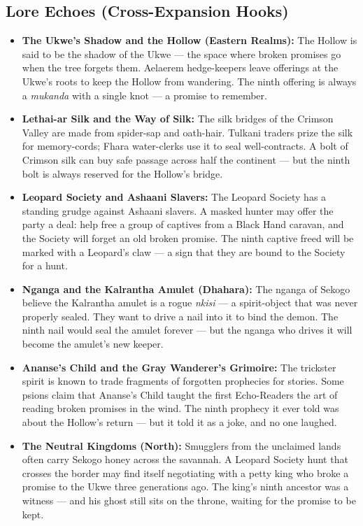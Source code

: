 \subsection*{Lore Echoes (Cross-Expansion Hooks)}
\begin{itemize}
  \item \textbf{The Ukwe's Shadow and the Hollow (Eastern Realms):} The Hollow is said to be the shadow of the Ukwe --- the space where broken promises go when the tree forgets them. Aelaerem hedge-keepers leave offerings at the Ukwe's roots to keep the Hollow from wandering. The ninth offering is always a \textit{mukanda} with a single knot --- a promise to remember.
  \item \textbf{Lethai-ar Silk and the Way of Silk:} The silk bridges of the Crimson Valley are made from spider-sap and oath-hair. Tulkani traders prize the silk for memory-cords; Fhara water-clerks use it to seal well-contracts. A bolt of Crimson silk can buy safe passage across half the continent --- but the ninth bolt is always reserved for the Hollow's bridge.
  \item \textbf{Leopard Society and Ashaani Slavers:} The Leopard Society has a standing grudge against Ashaani slavers. A masked hunter may offer the party a deal: help free a group of captives from a Black Hand caravan, and the Society will forget an old broken promise. The ninth captive freed will be marked with a Leopard's claw --- a sign that they are bound to the Society for a hunt.
  \item \textbf{Nganga and the Kalrantha Amulet (Dhahara):} The nganga of Sekogo believe the Kalrantha amulet is a rogue \textit{nkisi} --- a spirit-object that was never properly sealed. They want to drive a nail into it to bind the demon. The ninth nail would seal the amulet forever --- but the nganga who drives it will become the amulet's new keeper.
  \item \textbf{Ananse's Child and the Gray Wanderer's Grimoire:} The trickster spirit is known to trade fragments of forgotten prophecies for stories. Some psions claim that Ananse's Child taught the first Echo-Readers the art of reading broken promises in the wind. The ninth prophecy it ever told was about the Hollow's return --- but it told it as a joke, and no one laughed.
  \item \textbf{The Neutral Kingdoms (North):} Smugglers from the unclaimed lands often carry Sekogo honey across the savannah. A Leopard Society hunt that crosses the border may find itself negotiating with a petty king who broke a promise to the Ukwe three generations ago. The king's ninth ancestor was a witness --- and his ghost still sits on the throne, waiting for the promise to be kept.
\end{itemize}

